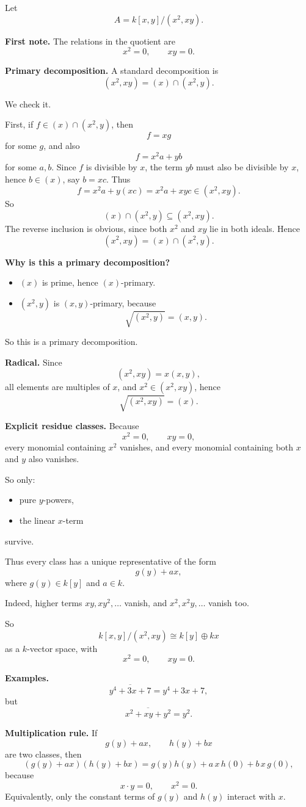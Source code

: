 \documentclass[12pt,a4paper]{article}
\theoremstyle{notespace}
\begin{document}
Let
\[
A=k[x,y]/(x^2,xy).
\]

\textbf{First note.}
The relations in the quotient are
\[
x^2=0,\qquad xy=0.
\]

\textbf{Primary decomposition.}
A standard decomposition is
\[
(x^2,xy)=(x)\cap(x^2,y).
\]

We check it.

First, if \(f\in (x)\cap(x^2,y)\), then
\[
f=xg
\]
for some \(g\), and also
\[
f=x^2a+yb
\]
for some \(a,b\).
Since \(f\) is divisible by \(x\), the term \(yb\) must also be divisible by \(x\), hence \(b\in (x)\), say \(b=xc\).
Thus
\[
f=x^2a+y(xc)=x^2a+xyc\in (x^2,xy).
\]
So
\[
(x)\cap(x^2,y)\subseteq (x^2,xy).
\]
The reverse inclusion is obvious, since both \(x^2\) and \(xy\) lie in both ideals.
Hence
\[
(x^2,xy)=(x)\cap(x^2,y).
\]

\textbf{Why is this a primary decomposition?}
\begin{itemize}
	\item \((x)\) is prime, hence \((x)\)-primary.
	\item \((x^2,y)\) is \((x,y)\)-primary, because
	\[
	\sqrt{(x^2,y)}=(x,y).
	\]
\end{itemize}

So this is a primary decomposition.

\textbf{Radical.}
Since
\[
(x^2,xy)=x(x,y),
\]
all elements are multiples of \(x\), and \(x^2\in (x^2,xy)\), hence
\[
\sqrt{(x^2,xy)}=(x).
\]

\textbf{Explicit residue classes.}
Because
\[
x^2=0,\qquad xy=0,
\]
every monomial containing \(x^2\) vanishes, and every monomial containing both \(x\) and \(y\) also vanishes.

So only:
\begin{itemize}
	\item pure \(y\)-powers,
	\item the linear \(x\)-term
\end{itemize}
survive.

Thus every class has a unique representative of the form
\[
g(y)+ax,
\]
where \(g(y)\in k[y]\) and \(a\in k\).

Indeed, higher terms \(xy,xy^2,\dots\) vanish, and \(x^2,x^2y,\dots\) vanish too.

So
\[
k[x,y]/(x^2,xy)\cong k[y]\oplus kx
\]
as a \(k\)-vector space, with
\[
x^2=0,\qquad xy=0.
\]

\textbf{Examples.}
\[
\overline{y^4+3x+7}=y^4+3x+7,
\]
but
\[
\overline{x^2+xy+y^2}=y^2.
\]

\textbf{Multiplication rule.}
If
\[
g(y)+ax,\qquad h(y)+bx
\]
are two classes, then
\[
(g(y)+ax)(h(y)+bx)=g(y)h(y)+a\,x\,h(0)+b\,x\,g(0),
\]
because
\[
x\cdot y=0,\qquad x^2=0.
\]
Equivalently, only the constant terms of \(g(y)\) and \(h(y)\) interact with \(x\).
\end{document}
